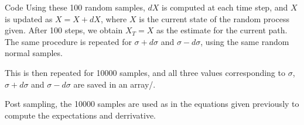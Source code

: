 \documentclass{article}
\begin{document}
\begin{question}
\begin{qsection}{Code}
		Using these 100 random samples, $dX$ is computed at each time step, and $X$ is updated as $X = X + dX$, where $X$ is the current state of the random process given. After 100 steps, we obtain $X_T = X$ as the estimate for the current path. The same procedure is repeated for $\sigma + d\sigma$ and $\sigma - d\sigma$, using the same random normal samples.

		This is then repeated for 10000 samples, and all three values corresponding to $\sigma$, $\sigma + d\sigma$ and $\sigma - d\sigma$ are saved in an array/.

		Post sampling, the 10000 samples are used as in the equations given previously to compute the expectations and derrivative.

	\end{qsection}

\end{question}
\end{document}
